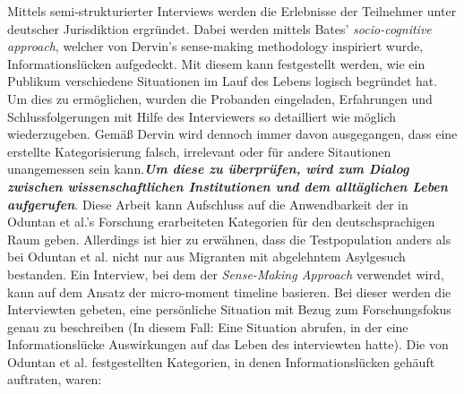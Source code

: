 Mittels semi-strukturierter Interviews werden die Erlebnisse der Teilnehmer unter deutscher Jurisdiktion ergr\"undet. Dabei werden mittels Bates' \textit{socio-cognitive approach}\citep{bates2005introduction}, welcher von Dervin's sense-making methodology\citep{dervin2003sense} inspiriert wurde, Informationsl\"ucken aufgedeckt.\newline
Mit diesem kann festgestellt werden, wie ein Publikum verschiedene Situationen im Lauf des Lebens logisch begr\"undet hat. Um dies zu erm\"oglichen, wurden die Probanden eingeladen, Erfahrungen und Schlussfolgerungen mit Hilfe des Interviewers so detailliert wie m\"oglich wiederzugeben.\newline
Gem\"a\ss{} Dervin wird dennoch immer davon ausgegangen, dass eine erstellte Kategorisierung falsch, irrelevant oder f\"ur andere Sitautionen unangemessen sein kann.\textit{\textbf{Um diese zu \"uberpr\"ufen, wird zum Dialog zwischen wissenschaftlichen Institutionen und dem allt\"aglichen Leben aufgerufen}}. Diese Arbeit kann Aufschluss auf die Anwendbarkeit der in Oduntan et al.'s Forschung erarbeiteten Kategorien f\"ur den deutschsprachigen Raum geben. Allerdings ist hier zu erwähnen, dass die Testpopulation anders als bei Oduntan et al. nicht nur aus Migranten mit abgelehntem Asylgesuch bestanden.\newline
Ein Interview, bei dem der \textit{Sense-Making Approach} verwendet wird, kann auf dem Ansatz der micro-moment timeline basieren. Bei dieser werden die Interviewten gebeten, eine pers\"onliche Situation mit Bezug zum Forschungsfokus genau zu beschreiben (In diesem Fall: Eine Situation abrufen, in der eine Informationsl\"ucke Auswirkungen auf das Leben des interviewten hatte).
Die von Oduntan et al. festgestellten Kategorien, in denen Informationsl\"ucken geh\"auft auftraten, waren:
